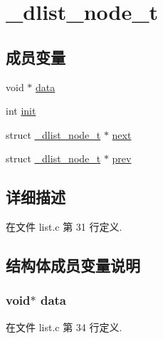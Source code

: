 \hypertarget{struct__dlist__node__t}{}\section{\+\_\+dlist\+\_\+node\+\_\+t}
\label{struct__dlist__node__t}
\subsection*{成员变量}
\begin{DoxyCompactItemize}
\item 
void $\ast$ \hyperlink{struct__dlist__node__t_a735984d41155bc1032e09bece8f8d66d}{data}
\item 
int \hyperlink{struct__dlist__node__t_a795ea50921b36311ffd5e7baa2ef1f7e}{init}
\item 
struct \hyperlink{struct__dlist__node__t}{\+\_\+dlist\+\_\+node\+\_\+t} $\ast$ \hyperlink{struct__dlist__node__t_a9fdf6e7d59374094c75a6682a6fe4ad0}{next}
\item 
struct \hyperlink{struct__dlist__node__t}{\+\_\+dlist\+\_\+node\+\_\+t} $\ast$ \hyperlink{struct__dlist__node__t_a398cfb3580651f0433e3b56a07d8a11c}{prev}
\end{DoxyCompactItemize}


\subsection{详细描述}


在文件 list.\+c 第 31 行定义.



\subsection{结构体成员变量说明}
\hypertarget{struct__dlist__node__t_a735984d41155bc1032e09bece8f8d66d}{}
\subsubsection[{data}]{\setlength{\rightskip}{0pt plus 5cm}void$\ast$ data}\label{struct__dlist__node__t_a735984d41155bc1032e09bece8f8d66d}


在文件 list.\+c 第 34 行定义.

\hypertarget{struct__dlist__node__t_a795ea50921b36311ffd5e7baa2ef1f7e}{}
